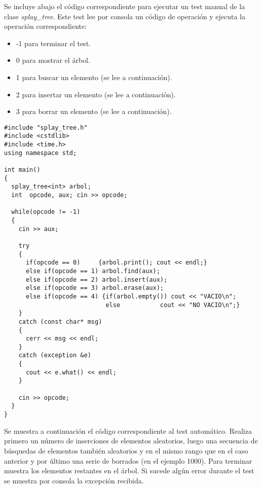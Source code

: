 \documentclass[letterpaper,12pt]{article}
\begin{document}
Se incluye abajo el código correspondiente para ejecutar un test manual de la
clase \textit{splay\_tree}. Este test lee por consola un código de operación
y ejecuta la operación correspondiente:

\setlength{\parskip}{0mm}         %
\begin{itemize}

\item -1 para terminar el test.
\item  0 para mostrar el árbol.
\item  1 para buscar un elemento (se lee a continuación).
\item  2 para insertar un elemento (se lee a continuación).
\item  3 para borrar un elemento (se lee a continuación).
     
\end{itemize}
\setlength{\parskip}{\baselineskip}         %

\begin{lstlisting}
#include "splay_tree.h"
#include <cstdlib>
#include <time.h>
using namespace std;

int main()
{
  splay_tree<int> arbol;
  int  opcode, aux; cin >> opcode;

  while(opcode != -1)
  {
    cin >> aux;

    try
    {
      if(opcode == 0)     {arbol.print(); cout << endl;}
      else if(opcode == 1) arbol.find(aux);
      else if(opcode == 2) arbol.insert(aux);
      else if(opcode == 3) arbol.erase(aux);
      else if(opcode == 4) {if(arbol.empty()) cout << "VACIO\n";
                            else           cout << "NO VACIO\n";}
    }
    catch (const char* msg)
    {
      cerr << msg << endl;
    }
    catch (exception &e)
    {
      cout << e.what() << endl;
    }

    cin >> opcode;
  }
}
\end{lstlisting}

Se muestra a continuación el código correspondiente al test automático. 
Realiza primero un número de inserciones de elementos aleatorios, luego una
secuencia de búsquedas de elementos también aleatorios y en el mismo rango que
en el caso anterior y por último una serie de borrados (en el ejemplo 1000).
Para terminar muestra los elementos restantes en el árbol. Si sucede algún 
error durante el test se muestra por consola la excepción recibida.
\end{document}

